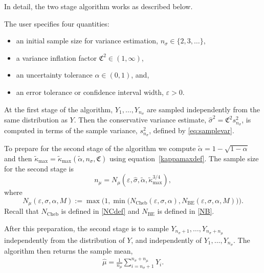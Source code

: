 \documentclass[graybox]{svmult}
\newcommand{\fudge}{\mathfrak{C}}
\newcommand{\hmu}{\hat{\mu}}
\newcommand{\hsigma}{\hat{\sigma}}
\begin{document}
In detail, the two stage algorithm works
as described below.


\begin{algo} \label{twostagealgo} The user specifies
four quantities:
\begin{itemize}
\item 
an initial sample size for variance estimation, $n_\sigma \in \{2,3, \ldots\}$,
\item
a variance inflation factor $\fudge^2\in(1,\infty)$,
\item
an uncertainty tolerance $\alpha\in(0,1)$, and,
\item
an error tolerance or confidence interval width, $\varepsilon>0$.
\end{itemize}

At the first stage of the algorithm,
$Y_1,\dots,Y_{n_\sigma}$ are sampled independently
from the same distribution as $Y$.
Then the conservative variance estimate, $\hat\sigma^2 = \fudge^2 s^2_{n_\sigma}$,
is computed in terms of the sample variance, $s^2_{n_\sigma}$, defined by \eqref{eq:samplevar}.

To prepare for the second stage of the algorithm
we compute $\tilde\alpha = 1-\sqrt{1-\alpha}$
and then $\tilde\kappa_{\max} = \tilde\kappa_{\max}(\tilde\alpha,n_\sigma,\fudge)$
using equation~\eqref{kappamaxdef}.
The sample size for the second stage is
\begin{equation} \label{nmudef}
n_\mu = N_{\mu}(\varepsilon,\hsigma,\tilde\alpha,\tilde\kappa_{\max}^{3/4}),
\end{equation}
where
\begin{equation} \label{NCBdef}
N_{\mu}(\varepsilon,\sigma,\alpha,M) 
:= \max\bigl(1,\min\bigl(N_{\text{Cheb}}(\varepsilon,\sigma,\alpha), 
N_{\text{BE}}(\varepsilon,\sigma,\alpha,M) \bigr) \bigr).
\end{equation} 
Recall that
$N_{\text{Cheb}}$ is defined in \eqref{NCdef} and  $N_{\text{BE}}$ 
is defined in \eqref{NB}.  

After this preparation, the second stage is to sample
$Y_{n_\sigma+1},\dots,Y_{n_\sigma+n_\mu}$ independently
from the distribution of $Y$, and independently of $Y_{1},\dots,Y_{n_\sigma}$.  The algorithm then returns the sample mean,
\begin{align}\label{eq:theestimate}
\hmu = \frac1{n_\mu}\sum_{i=n_\sigma+1}^{n_\sigma+n_\mu}Y_i.
\end{align}
\end{algo}

\bigskip
\end{document}
